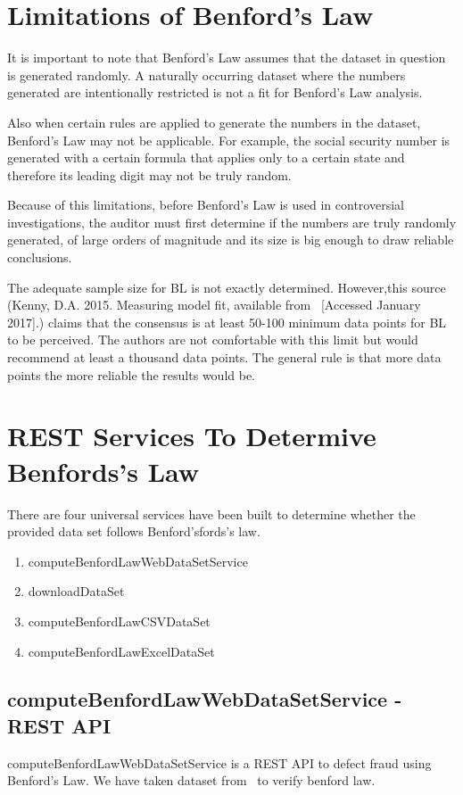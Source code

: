 \section{Limitations of Benford’s Law}
It is important to note that Benford’s Law assumes that the 
dataset in question is generated randomly. A naturally occurring 
dataset where the numbers generated are intentionally restricted 
is not a fit for Benford’s Law analysis. 

Also when certain rules are applied to generate 
the numbers in the dataset, Benford’s Law may not be applicable.
For example, the social security number is generated with a 
certain formula that applies only to a certain state 
and therefore its leading digit may not be truly random. 

Because of this limitations, before Benford’s Law is
used in controversial investigations, the auditor must 
first determine if the numbers are truly randomly generated, 
of large orders of magnitude and its size is big enough 
to draw reliable conclusions.

The adequate sample size for BL is not exactly 
determined. However,this source 
(Kenny, D.A. 2015. Measuring model fit, 
available from~\cite{hid-sp18-514-Kenny-Measuring-model}
[Accessed January 2017].)  
claims that the consensus is at least 50-100 minimum data 
points for BL to be perceived. The authors are not 
comfortable with this limit but would recommend at least 
a thousand data points. The general rule is that more 
data points the more reliable the results would be.

\section{REST Services To Determive Benfords's Law}

There are four universal services have been built to determine
whether the provided data set follows Benford’sfords's law.

\begin{enumerate}
 \item computeBenfordLawWebDataSetService
 \item downloadDataSet
 \item computeBenfordLawCSVDataSet
 \item computeBenfordLawExcelDataSet
\end{enumerate}

\subsection{computeBenfordLawWebDataSetService - REST API}
computeBenfordLawWebDataSetService is 
a REST API to defect fraud using Benford's Law.
We have taken dataset from~\cite{hid-sp18-514-aust-cc-benford}
to verify benford law.

